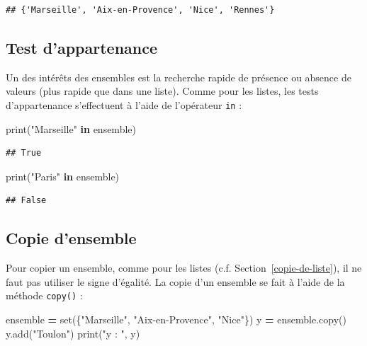 \documentclass[12pt,]{book}
\newenvironment{Shaded}{\begin{snugshade}}{\end{snugshade}}
\newcommand{\KeywordTok}[1]{\textcolor[rgb]{0.13,0.29,0.53}{\textbf{#1}}}
\newcommand{\StringTok}[1]{\textcolor[rgb]{0.31,0.60,0.02}{#1}}
\newcommand{\OperatorTok}[1]{\textcolor[rgb]{0.81,0.36,0.00}{\textbf{#1}}}
\newcommand{\BuiltInTok}[1]{#1}
\newcommand{\NormalTok}[1]{#1}
\numberwithin{equation}{section}
\numberwithin{countremarque}{section}
\begin{document}
\begin{lstlisting}
## {'Marseille', 'Aix-en-Provence', 'Nice', 'Rennes'}
\end{lstlisting}

\subsection{Test d'appartenance}\label{test-dappartenance-1}

Un des intérêts des ensembles est la recherche rapide de présence ou
absence de valeurs (plus rapide que dans une liste). Comme pour les
listes, les tests d'appartenance s'effectuent à l'aide de l'opérateur
\texttt{in} :

\begin{Shaded}
\begin{Highlighting}[]
\BuiltInTok{print}\NormalTok{(}\StringTok{"Marseille"} \KeywordTok{in}\NormalTok{ ensemble)}
\end{Highlighting}
\end{Shaded}

\begin{lstlisting}
## True
\end{lstlisting}

\begin{Shaded}
\begin{Highlighting}[]
\BuiltInTok{print}\NormalTok{(}\StringTok{"Paris"} \KeywordTok{in}\NormalTok{ ensemble)}
\end{Highlighting}
\end{Shaded}

\begin{lstlisting}
## False
\end{lstlisting}

\subsection{Copie d'ensemble}\label{copie-densemble}

Pour copier un ensemble, comme pour les listes (c.f.
Section~\ref{copie-de-liste}), il ne faut pas utiliser le signe
d'égalité. La copie d'un ensemble se fait à l'aide de la méthode
\texttt{copy()} :

\begin{Shaded}
\begin{Highlighting}[]
\NormalTok{ensemble }\OperatorTok{=} \BuiltInTok{set}\NormalTok{(\{}\StringTok{"Marseille"}\NormalTok{, }\StringTok{"Aix-en-Provence"}\NormalTok{, }\StringTok{"Nice"}\NormalTok{\})}
\NormalTok{y }\OperatorTok{=}\NormalTok{ ensemble.copy()}
\NormalTok{y.add(}\StringTok{"Toulon"}\NormalTok{)}
\BuiltInTok{print}\NormalTok{(}\StringTok{"y : "}\NormalTok{, y)}
\end{Highlighting}
\end{Shaded}
\end{document}
